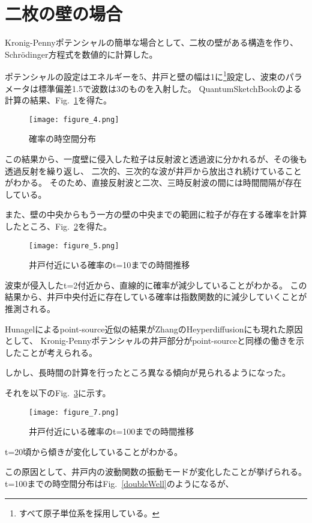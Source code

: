 \documentclass[autodetect-engine,dvipdfmx-if-dvi,ja=standard,a4paper,layout=v2]{bxjsreport}
\newcommand{\fref}[1]{Fig.~\ref{#1}}
\begin{document}
    \section{二枚の壁の場合}
    Kronig-Pennyポテンシャルの簡単な場合として、二枚の壁がある構造を作り、Schrödinger方程式を数値的に計算した。\par
    ポテンシャルの設定はエネルギーを5、井戸と壁の幅は1に\footnote{
      すべて原子単位系を採用している。
    }設定し、波束のパラメータは標準偏差1.5で波数は3のものを入射した。
    QuantumSketchBookのよる計算の結果、\fref{plt}を得た。
    \begin{figure}[h]
      \centering
      \texttt{[image: figure\_4.png]}
      \caption{確率の時空間分布}
      \label{plt}
    \end{figure}
    この結果から、一度壁に侵入した粒子は反射波と透過波に分かれるが、その後も透過反射を繰り返し、
    二次的、三次的な波が井戸から放出され続けていることがわかる。
    そのため、直接反射波と二次、三時反射波の間には時間間隔が存在している。\par
    また、壁の中央からもう一方の壁の中央までの範囲に粒子が存在する確率を計算したところ、\fref{center1}を得た。\par
    \begin{figure}[h]
      \centering
      \texttt{[image: figure\_5.png]}
      \caption{井戸付近にいる確率のt=10までの時間推移}
      \label{center1}
    \end{figure}
    波束が侵入したt=2付近から、直線的に確率が減少していることがわかる。
    この結果から、井戸中央付近に存在している確率は指数関数的に減少していくことが推測される。\par
    Hunagelによるpoint-source近似の結果がZhangのHeyperdiffusionにも現れた原因として、
    Kronig-Pennyポテンシャルの井戸部分がpoint-sourceと同様の働きを示したことが考えられる。\par
    しかし、長時間の計算を行ったところ異なる傾向が見られるようになった。\par
    それを以下の\fref{center2}に示す。
    \begin{figure}
      \centering
      \texttt{[image: figure\_7.png]}
      \caption{井戸付近にいる確率のt=100までの時間推移}
      \label{center2}
    \end{figure}
    t=20頃から傾きが変化していることがわかる。\par
    この原因として、井戸内の波動関数の振動モードが変化したことが挙げられる。
    t=100までの時空間分布は\fref{doubleWell}のようになるが、
\end{document}
